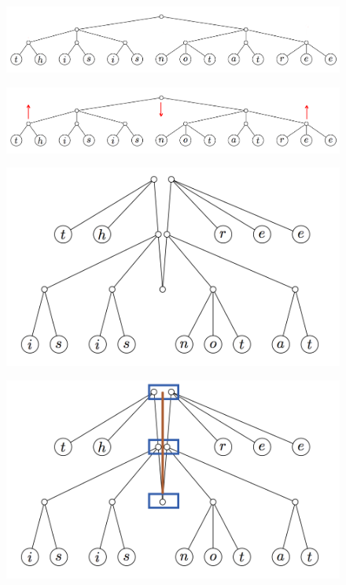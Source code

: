 \documentclass{beamer}
\begin{document}
\begin{frame}
\begin{figure}
\includegraphics[width=\textwidth]{finger-tree-0.png}
\end{figure}
\end{frame}

\begin{frame}
\begin{figure}
\includegraphics[width=\textwidth]{finger-tree-1.png}
\end{figure}
\end{frame}

\begin{frame}
\begin{figure}
\includegraphics[width=\textwidth]{finger-tree-2.png}
\end{figure}
\end{frame}

\begin{frame}
\begin{figure}
\includegraphics[width=\textwidth]{finger-tree-3.png}
\end{figure}
\end{frame}
\end{document}

